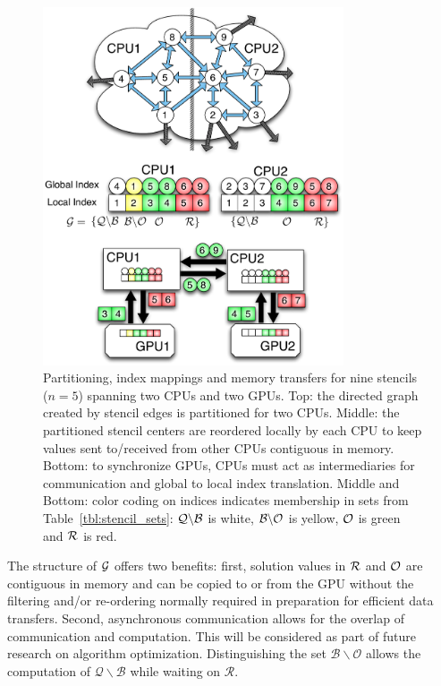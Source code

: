 \documentclass{report}
\begin{document}
        \begin{figure}[ht] 
            \centering
            \includegraphics[width=3.5in]{../figures/paper1/figures/omnigraffle/SimpleExample.pdf} 
            \caption{Partitioning, index mappings and memory transfers for nine stencils ($n=5$) spanning two CPUs and two GPUs. Top: the directed graph created by stencil edges is partitioned for two CPUs. Middle: the partitioned stencil centers are reordered locally by each CPU to keep values sent to/received from other CPUs contiguous in memory. Bottom: to synchronize GPUs, CPUs must act as intermediaries for communication and global to local index translation. Middle and Bottom: color coding on indices indicates membership in sets from Table~\ref{tbl:stencil_sets}: $\mathcal{Q} \backslash \mathcal{B}$ is white, $\mathcal{B} \backslash \mathcal{O}$ is yellow, $\mathcal{O}$ is green and $\mathcal{R}$ is red.
            }
            \label{fig:stencilSets2CPU}
        \end{figure}	

 The structure of $\mathcal{G}$ offers two benefits: first, solution values in $\mathcal{R}$ and $\mathcal{O}$ are contiguous in memory and can be copied to or from the GPU without the filtering and/or re-ordering normally required in preparation for efficient data transfers. Second, asynchronous communication allows for the overlap of communication and computation. This will be considered as part of future research on algorithm optimization.  Distinguishing the set $\mathcal{B} \backslash \mathcal{O}$ allows the computation of $\mathcal{Q}\backslash \mathcal{B}$ while waiting on $\mathcal{R}$. 
\end{document}
